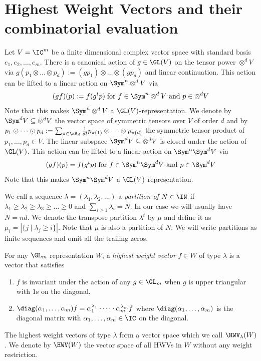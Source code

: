 \section{Highest Weight Vectors and their combinatorial evaluation}
\label{sec:base}
\label{sec:prel}
Let $V = \IC^m$ be a finite dimensional complex vector space with standard basis $e_1, e_2, \ldots, e_m$.
There is a canonical action of $g \in \GL(V)$ on the tensor power $\otimes^d V$ via
$g(p_1 \otimes \dots \otimes p_d) := (gp_1) \otimes \dots \otimes (gp_{d})$ and linear continuation.
This action can be lifted to a linear action on $\Sym^n\otimes^d V$ via
\[
    (gf)(p) := f(g^{t}p)\;\text{for $f \in \Sym^n\otimes^d V$ and $p \in \otimes^d V$}
\]
Note that this makes $\Sym^n\otimes^d V$ a $\GL(V)$-representation.
We denote by $\Sym^d V \subseteq \otimes^d V$ the vector space of symmetric tensors over $V$ of order $d$ and by $p_1 \odot \dots \odot p_d := \sum_{\pi \in \aS_d}\frac{1}{d!} p_{\pi(1)} \otimes \dots \otimes p_{\pi(d)}$ the symmetric tensor product of $p_1, \ldots, p_d \in V$.
The linear subspace $\Sym^d V \subseteq \otimes^d V$ is closed under the action of $\GL(V)$.
This action can be lifted to a linear action on $\Sym^n\Sym^d V$ via
\[
    (gf)(p) = f(g^{t}p)\;\text{for $f \in \Sym^n\Sym^d V$ and $p \in \Sym^d V$}
\]
Note that this makes $\Sym^n\Sym^d V$ a $\GL(V)$-representation.

We call a sequence $\lambda = (\lambda_1, \lambda_2, \dots)$ a \emph{partition of $N \in \IN$} if $\lambda_1 \geq \lambda_2 \geq \lambda_3 \geq \ldots \geq 0$ and $\sum_{i \geq 1}\lambda_i = N$. In our case we will usually have $N=nd$.
We denote the transpose partition $\lambda^t$ by $\mu$ and define it as $\mu_i = |\{j \mid \lambda_j \geq i\}|$.
Note that $\mu$ is also a partition of $N$.
We will write partitions as finite sequences and omit all the trailing zeros.

For any $\GL_m$ representation $W$, a \emph{highest weight vector} $f \in W$ of type $\lambda$ is a vector that satisfies
\begin{enumerate}
    \item $f$ is invariant under the action of any $g \in \GL_m$ when $g$ is upper triangular with $1$s on the diagonal.
    \item $\diag(\alpha_1, \ldots, \alpha_m) f = \alpha_1^{\lambda_1} \cdot \cdots \cdot \alpha_m^{\lambda_m} f$ where $\diag(\alpha_1, \ldots, \alpha_m)$ is the diagonal matrix with $\alpha_1, \ldots, \alpha_m \in \IC$ on the diagonal.
\end{enumerate}
The highest weight vectors of type $\lambda$ form a vector space which we call $\HWV_\lambda(W)$.
We denote by $\HWV(W)$ the vector space of all HWVs in $W$ without any weight restriction.

